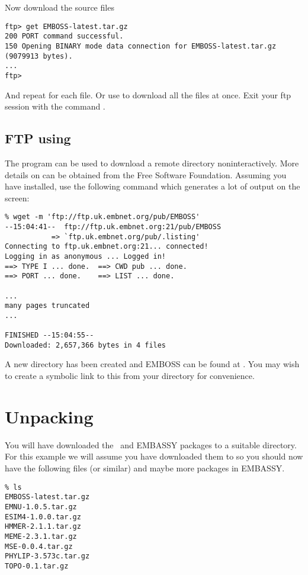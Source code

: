 \documentclass{report}
\begin{document}
Now download the source files

\begin{verbatim}
ftp> get EMBOSS-latest.tar.gz
200 PORT command successful.
150 Opening BINARY mode data connection for EMBOSS-latest.tar.gz 
(9079913 bytes).
...
ftp>
\end{verbatim}

And repeat for each file. Or use  to download all the
files at once.  Exit your ftp session with the command .

\subsection{FTP using }
The program  can be used to download a remote directory
noninteractively. More details on  can be obtained from
the Free Software Foundation. Assuming you
have  installed, use the following command which
generates a lot of output on the screen:

\begin{verbatim}
% wget -m 'ftp://ftp.uk.embnet.org/pub/EMBOSS'
--15:04:41--  ftp://ftp.uk.embnet.org:21/pub/EMBOSS
           => `ftp.uk.embnet.org/pub/.listing'
Connecting to ftp.uk.embnet.org:21... connected!
Logging in as anonymous ... Logged in!
==> TYPE I ... done.  ==> CWD pub ... done.
==> PORT ... done.    ==> LIST ... done.

...
many pages truncated
...

FINISHED --15:04:55--
Downloaded: 2,657,366 bytes in 4 files
\end{verbatim}

A new directory  has been created and
EMBOSS can be found at . You
may wish to create a symbolic link to this from your
 directory for convenience.


\section{Unpacking}

You will have downloaded the \EMBOSS\ and EMBASSY packages to a
suitable directory. For this example we will assume you have
downloaded them to  so you should now have the
following files (or similar) and maybe more packages in EMBASSY.

\begin{verbatim}
% ls
EMBOSS-latest.tar.gz
EMNU-1.0.5.tar.gz
ESIM4-1.0.0.tar.gz
HMMER-2.1.1.tar.gz
MEME-2.3.1.tar.gz
MSE-0.0.4.tar.gz
PHYLIP-3.573c.tar.gz
TOPO-0.1.tar.gz
\end{verbatim}
\end{document}
